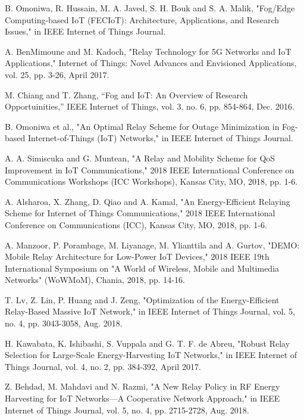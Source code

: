 \documentclass[journal]{IEEEtran}
\begin{document}
\begin{thebibliography}{1}
B. Omoniwa, R. Hussain, M. A. Javed, S. H. Bouk and S. A. Malik, "Fog/Edge Computing-based IoT (FECIoT): Architecture, Applications, and Research Issues," in IEEE Internet of Things Journal.

A. BenMimoune and M. Kadoch, "Relay Technology for 5G Networks and IoT Applications," Internet of Things: Novel Advances and Envisioned Applications, vol. 25, pp. 3-26, April 2017.

M. Chiang and T. Zhang, ``Fog and IoT: An Overview of Research Opportuinities,'' IEEE Internet of Things, vol. 3, no. 6, pp. 854-864, Dec.
2016.

B. Omoniwa et al., "An Optimal Relay Scheme for Outage Minimization in Fog-based Internet-of-Things (IoT) Networks," in IEEE Internet of Things Journal.

A. A. Simiscuka and G. Muntean, "A Relay and Mobility Scheme for QoS Improvement in IoT Communications," 2018 IEEE International Conference on Communications Workshops (ICC Workshops), Kansas City, MO, 2018, pp. 1-6.

A. Alsharoa, X. Zhang, D. Qiao and A. Kamal, "An Energy-Efficient Relaying Scheme for Internet of Things Communications," 2018 IEEE International Conference on Communications (ICC), Kansas City, MO, 2018, pp. 1-6.

A. Manzoor, P. Porambage, M. Liyanage, M. Ylianttila and A. Gurtov, "DEMO: Mobile Relay Architecture for Low-Power IoT Devices," 2018 IEEE 19th International Symposium on "A World of Wireless, Mobile and Multimedia Networks" (WoWMoM), Chania, 2018, pp. 14-16.

T. Lv, Z. Lin, P. Huang and J. Zeng, "Optimization of the Energy-Efficient Relay-Based Massive IoT Network," in IEEE Internet of Things Journal, vol. 5, no. 4, pp. 3043-3058, Aug. 2018.

H. Kawabata, K. Ishibashi, S. Vuppala and G. T. F. de Abreu, "Robust Relay Selection for Large-Scale Energy-Harvesting IoT Networks," in IEEE Internet of Things Journal, vol. 4, no. 2, pp. 384-392, April 2017.

Z. Behdad, M. Mahdavi and N. Razmi, "A New Relay Policy in RF Energy Harvesting for IoT Networks—A Cooperative Network Approach," in IEEE Internet of Things Journal, vol. 5, no. 4, pp. 2715-2728, Aug. 2018.


\end{thebibliography}
\end{document}
